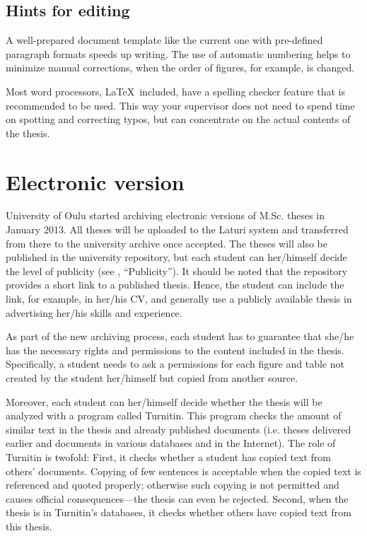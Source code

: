 \subsection{Hints for editing}

A well-prepared document template like the current one with
pre-defined paragraph formats speeds up writing. The use of automatic
numbering helps to minimize manual corrections, when the order of
figures, for example, is changed.

Most word processors, \LaTeX\ included, have a spelling checker
feature that is recommended to be used. This way your supervisor does
not need to spend time on spotting and correcting typos, but can
concentrate on the actual contents of the thesis.

\section{Electronic version}

University of Oulu started archiving electronic versions of M.Sc.
theses in January 2013. All theses will be uploaded to the Laturi
system and transferred from there to the university archive once
accepted. The theses will also be published in the university
repository, but each student can her/himself decide the level of
publicity (see , “Publicity”). It should be
noted that the repository provides a short link to a published
thesis. Hence, the student can include the link, for example, in
her/his CV, and generally use a publicly available thesis in
advertising her/his skills and experience.

As part of the new archiving process, each student has to guarantee
that she/he has the necessary rights and permissions to the content
included in the thesis. Specifically, a student needs to ask a
permissions for each figure and table not created by the student
her/himself but copied from another source.

Moreover, each student can her/himself decide whether the thesis will
be analyzed with a program called Turnitin. This program checks the
amount of similar text in the thesis and already published documents
(i.e. theses delivered earlier and documents in various databases and
in the Internet). The role of Turnitin is twofold: First, it checks
whether a student has copied text from others’ documents. Copying of
few sentences is acceptable when the copied text is referenced and
quoted properly; otherwise such copying is not permitted and causes
official consequences---the thesis can even be rejected. Second, when
the thesis is in Turnitin’s databases, it checks whether others have
copied text from this thesis.

